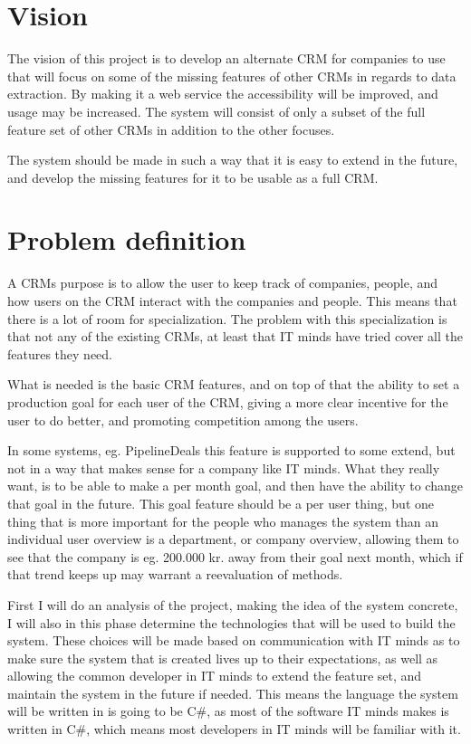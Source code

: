 \section{Vision}
\label{sec:Vision}
The vision of this project is to develop an alternate CRM for companies to use
that will focus on some of the missing features of other CRMs in regards to data
extraction. By making it a web service the accessibility will be improved, and
usage may be increased. The system will consist of only a subset of the full
feature set of other CRMs in addition to the other focuses. 

The system should be made in such a way that it is easy to extend in the future,
and develop the missing features for it to be usable as a full CRM.

\section{Problem definition}
\label{sec:Problem definition}
A CRMs purpose is to allow the user to keep track of companies, people, and
how users on the CRM interact with the companies and people. This means that
there is a lot of room for specialization. The problem with this specialization
is that not any of the existing CRMs, at least that IT minds have tried cover
all the features they need. 

What is needed is the basic CRM features, and on top of that the ability to set
a production goal for each user of the CRM, giving a more clear incentive for
the user to do better, and promoting competition among the users. 

In some systems, eg. PipelineDeals\cite{pipelinedeals:features} this feature is
supported to some extend, but not in a way that makes sense for a company like
IT minds. What they really want, is to be able to make a per month goal, and
then have the ability to change that goal in the future. This goal feature
should be a per user thing, but one thing that is more important for the people
who manages the system than an individual user overview is a department, or
company overview, allowing them to see that the company is eg. 200.000 kr. away
from their goal next month, which if that trend keeps up may warrant a
reevaluation of methods. 

First I will do an analysis of the project, making the idea of the system
concrete, I will also in this phase determine the technologies that will be used
to build the system. These choices will be made based on communication with IT
minds as to make sure the system that is created lives up to their
expectations, as well as allowing the common developer in IT minds to extend the
feature set, and maintain the system in the future if needed. This means the
language the system will be written in is going to be C\#, as most of the
software IT minds makes is written in C\#, which means most developers in IT
minds will be familiar with it. 

